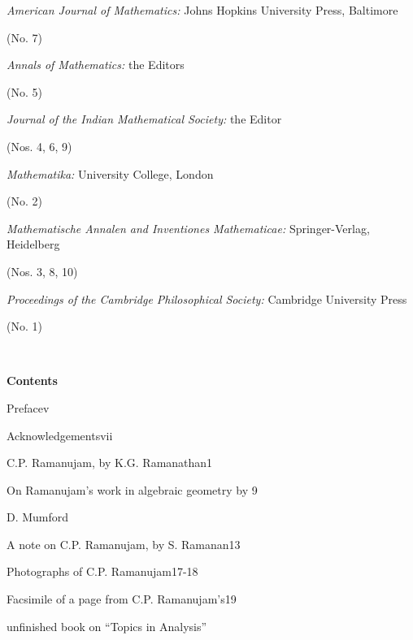 {\bigskip

\noindent \emph{American Journal of Mathematics:} Johns Hopkins 
University Press, Baltimore

\noindent (No. 7)

\medskip

\noindent \emph{Annals of Mathematics:} the Editors

\noindent (No. 5)

\medskip

\noindent \emph{Journal of the Indian Mathematical Society:} the Editor

\noindent (Nos. 4, 6, 9)

\medskip

\noindent \emph{Mathematika:} University College, London

\noindent (No. 2)

\medskip

\noindent \emph{Mathematische Annalen and Inventiones Mathematicae:} 
Springer-Verlag, Heidelberg

\noindent (Nos. 3, 8, 10)

\medskip

\noindent \emph{Proceedings of the Cambridge Philosophical Society:} Cambridge University Press

\noindent (No. 1)

\newpage

~\phantom{a}
\thispagestyle{empty}

\newpage
}

\thispagestyle{empty}

\noindent
{\bf\huge Contents}

\vskip 1cm
\relax

\noindent
Preface\hfill v
\smallskip

\noindent
Acknowledgements\hfill vii
\smallskip

\noindent
C.P. Ramanujam, by K.G. Ramanathan\hfill 1
\smallskip

\noindent
On Ramanujam's work in algebraic geometry by \hfill 9\;

D. Mumford
\smallskip

\noindent
A note on C.P. Ramanujam, by S. Ramanan\hfill 13
\smallskip

\noindent
Photographs of C.P. Ramanujam\hfill 17-18
\smallskip

\noindent
Facsimile of a page from C.P. Ramanujam's\hfill 19\;

unfinished book on ``Topics in Analysis''

\bigskip

